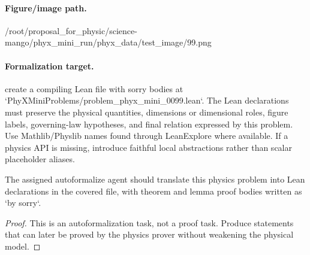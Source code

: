 \paragraph{Figure/image path.}
/root/proposal\_for\_physic/science-mango/phyx\_mini\_run/phyx\_data/test\_image/99.png

\paragraph{Formalization target.}
create a compiling Lean file with sorry bodies at `PhyXMiniProblems/problem\_phyx\_mini\_0099.lean`. The Lean declarations must preserve the physical quantities, dimensions or dimensional roles, figure labels, governing-law hypotheses, and final relation expressed by this problem.
Use Mathlib/Physlib names found through LeanExplore where available. If a physics API is missing, introduce faithful local abstractions rather than scalar placeholder aliases.

\begin{theorem}
\label{thm:physics:phyx_mini_0099:target}
The assigned autoformalize agent should translate this physics problem into Lean declarations in the covered file, with theorem and lemma proof bodies written as `by sorry`.
\end{theorem}
\begin{proof}
This is an autoformalization task, not a proof task. Produce statements that can later be proved by the physics prover without weakening the physical model.
\end{proof}

